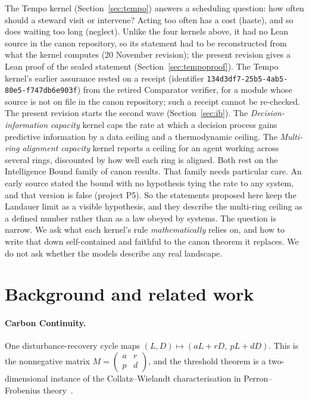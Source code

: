 \documentclass[11pt]{article}
\theoremstyle{definition}
\theoremstyle{remark}
\begin{document}
The Tempo kernel (Section~\ref{sec:tempo}) answers a scheduling question: how often should a steward visit or intervene?
Acting too often has a cost (haste), and so does waiting too long (neglect).
Unlike the four kernels above, it had no Lean source in the canon repository, so its statement had to be reconstructed from
what the kernel computes (20 November revision); the present revision gives a Lean proof of the sealed statement (Section~\ref{sec:tempoproof}).
The Tempo kernel's earlier assurance rested on a receipt (identifier \texttt{134d3df7-25b5-4ab5-80e5-f747db6e903f}) from the
retired Comparator verifier, for a module whose source is not on file in the canon repository; such a receipt cannot be re-checked.
The present revision starts the second wave (Section~\ref{sec:ib}). The \emph{Decision-information capacity} kernel caps the rate at
which a decision process gains predictive information by a data ceiling and a thermodynamic ceiling. The
\emph{Multi-ring alignment capacity} kernel reports a ceiling for an agent working across several rings, discounted by how well
each ring is aligned. Both rest on the Intelligence Bound family of canon results. That family needs particular care. An early
source stated the bound with no hypothesis tying the rate to any system, and that version is false (project P5). So the
statements proposed here keep the Landauer limit as a visible hypothesis, and they describe the multi-ring ceiling as a
defined number rather than as a law obeyed by systems.
The question is narrow. We ask what each kernel's rule \emph{mathematically} relies on, and how to write that down
self-contained and faithful to the canon theorem it replaces. We do not ask whether the models describe any real landscape.

\section{Background and related work}
\paragraph{Carbon Continuity.} One disturbance-recovery cycle maps $(L,D)\mapsto(aL+rD,\ pL+dD)$.
This is the nonnegative matrix $M=\begin{pmatrix}a&r\\p&d\end{pmatrix}$, and the threshold theorem is a
two-dimensional instance of the Collatz--Wielandt characterisation in Perron--Frobenius theory~\cite{BermanPlemmons1994}.
\end{document}
